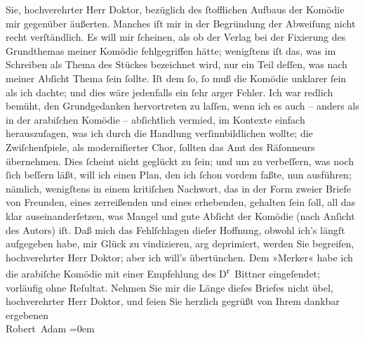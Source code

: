 \begin{ledgroupsized}[t]{13cm}
               Sie, hochverehrter Herr Doktor, {\pb}bezüglich des
               ſtofflichen Aufbaus der Komödie mir gegenüber äußerten. Manches iſt mir in der
               Begründung der Abweiſung nicht recht verſtändlich. Es will mir ſcheinen, als ob der
               Verlag bei der Fixierung des Grundthemas meiner Komödie fehlgegriffen hätte;
               wenigſtens iſt das, was im Schreiben als Thema des Stückes bezeichnet wird, nur ein
               Teil deſſen, was nach meiner Abſicht Thema ſein ſollte. Iſt dem ſo, ſo muß die
               Komödie unklarer ſein als ich dachte; und dies wäre jedenfalls ein ſehr arger Fehler.
               Ich war redlich bemüht, den Grundgedanken hervortreten zu laſſen, {\pb}wenn ich es auch – anders als in der arabiſchen Komödie – abſichtlich vermied,
               im Kontexte einfach herauszuſagen, was ich durch die Handlung verſinnbildlichen
               wollte; die Zwiſchenſpiele, als moderniſierter Chor, ſollten das Amt des Räſonneurs
               übernehmen.\pend
           \pstart
           Dies ſcheint nicht geglückt zu ſein; und um zu verbeſſern, was noch ſich beſſern
               läßt, will ich einen Plan, den ich ſchon vordem faßte, nun ausführen; nämlich,
               wenigſtens in einem kritiſchen Nachwort, das in der Form zweier Briefe von Freunden,
               eines zerreißenden und eines erhebenden, {\pb}gehalten
               ſein ſoll, all das klar auseinanderſetzen, was Mangel und gute Abſicht der Komödie
               (nach Anſicht des Autors) iſt.\pend
           \pstart
           Daß mich das Fehlſchlagen dieſer Hoffnung, obwohl ich’s längſt aufgegeben habe, mir
               Glück zu vindizieren, arg deprimiert, werden Sie begreifen, hochverehrter Herr
               Doktor; aber ich will’s übertünchen.\pend
           \pstart
           Dem »Merker« habe ich die arabiſche Komödie mit einer Empfehlung des D\textsuperscript{r} Bittner
               eingeſendet; vorläufig ohne Reſultat.\pend
           \pstart
           Nehmen Sie mir die Länge dieſes Briefes nicht übel, hochverehrter Herr Doktor, und
               ſeien Sie herzlich gegrüßt von Ihrem\pend
           \pstart
           dankbar ergebenen{\\[\baselineskip]}\spacefill\mbox{Robert Adam}\pend
           \leftskip=0em{}
         
         \endnumbering{}\end{ledgroupsized}  \newcommand{\dateiname}{L02002}\newcommand{\titel}{Robert Adam an Arthur Schnitzler, 3. 2. 1911}\newcommand{\editorInnen}{Martin Anton Müller und Gerd-Hermann Susen}
      